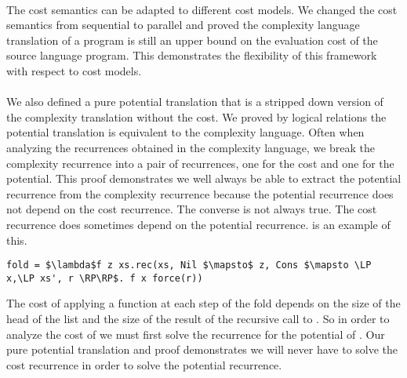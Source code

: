 \paragraph{}
The cost semantics can be adapted to different cost models. We changed the cost
semantics from sequential to parallel and proved the complexity language
translation of a program is still an upper bound on the evaluation cost of the
source language program. This demonstrates the flexibility of this framework
with respect to cost models.

\paragraph{}
We also defined a pure potential translation that is a stripped down version of
the complexity translation without the cost. We proved by logical relations the
potential translation is equivalent to the complexity language. Often when
analyzing the recurrences obtained in the complexity language, we break the
complexity recurrence into a pair of recurrences, one for the cost and one for
the potential. This proof demonstrates we well always be able to extract the
potential recurrence from the complexity recurrence because the potential
recurrence does not depend on the cost recurrence. The converse is not always
true. The cost recurrence does sometimes depend on the potential recurrence.
 is an example of this.
%
\begin{lstlisting}
fold = $\lambda$f z xs.rec(xs, Nil $\mapsto$ z, Cons $\mapsto \LP x,\LP xs', r \RP\RP$. f x force(r))
\end{lstlisting}
%
The cost of applying a function  at each
step of the fold depends on the size of the head of the list and the size of
the result of the recursive call to . So in order to analyze the cost
of  we must first solve the recurrence for the potential of .
Our pure potential translation and proof demonstrates we will never have to
solve the cost recurrence in order to solve the potential recurrence.


